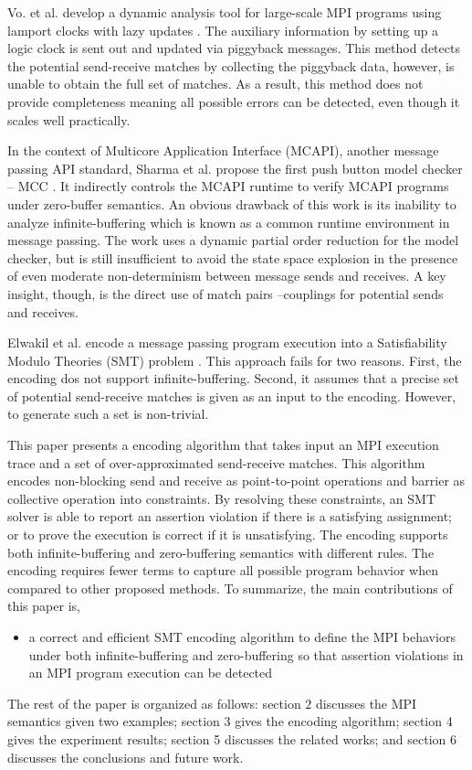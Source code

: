 Vo. et al. develop a dynamic analysis tool for large-scale MPI programs using lamport clocks with lazy updates \cite{}. The auxiliary information by setting up a logic clock is sent out and updated via piggyback messages. This method detects the potential send-receive matches by collecting the piggyback data, however, is unable to obtain the full set of matches. As a result, this method does not provide completeness meaning all possible errors can be detected, even though it scales well practically.

In the context of Multicore Application Interface (MCAPI), another message passing API standard, Sharma et al. propose the first push button model checker -- MCC \cite{}. It indirectly controls the MCAPI runtime to verify MCAPI programs under zero-buffer semantics. An obvious drawback of this work is its inability to analyze infinite-buffering which is known as a common runtime environment in message passing. The work uses a dynamic partial order reduction for the model checker, but is still insufficient to avoid the state space explosion in the presence of even moderate non-determinism between message sends and receives. A key insight, though, is the direct use of match pairs --couplings for potential sends and receives.

Elwakil et al. encode a message passing program execution into a Satisfiability Modulo Theories (SMT) problem \cite{}. This approach fails for two reasons. First, the encoding dos not support infinite-buffering. Second, it assumes that a precise set of potential send-receive matches is given as an input to the encoding. However, to generate such a set is non-trivial.

This paper presents a encoding algorithm that takes input an MPI execution trace and a set of over-approximated send-receive matches. This algorithm encodes non-blocking send and receive as point-to-point operations and barrier as collective operation into constraints. By resolving these constraints, an SMT solver is able to report an assertion violation if there is a satisfying assignment; or to prove the execution is correct if it is unsatisfying.  The encoding supports both infinite-buffering and zero-buffering semantics with different rules. The encoding requires fewer terms to capture all possible program behavior when compared to other proposed methods. To summarize, the main contributions of this paper is,
\begin{itemize}
\item a correct and efficient SMT encoding algorithm to define the MPI behaviors under both infinite-buffering and zero-buffering so that assertion violations in an MPI program execution can be detected
\end{itemize}

The rest of the paper is organized as follows: section $2$ discusses the MPI semantics given two examples; section $3$ gives the encoding algorithm; section 4 gives the experiment results; section 5 discusses the related works; and section 6 discusses the conclusions and future work.

\examplefigone


           